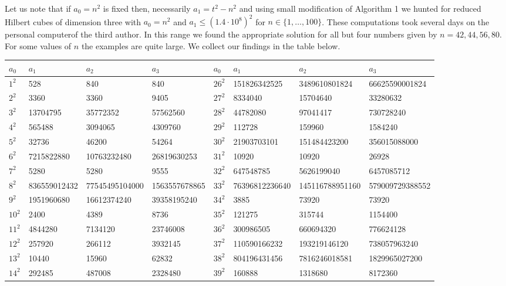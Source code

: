 \documentclass[10pt]{amsart}
\theoremstyle{plain}
\begin{document}
Let us note that if $a_{0}=n^2$ is fixed then, necessarily $a_{1}=t^2-n^2$ and using small modification of Algorithm 1 we hunted for reduced Hilbert cubes of dimension three with $a_{0}=n^2$ and $a_{1}\leq (1.4\cdot 10^8)^2$ for $n\in\{1, \ldots, 100\}$. These computations took several days on the personal computerof the third author. In this range we found the appropriate solution for all but four numbers given by $n=42, 44, 56,  80$. For some values of $n$ the examples are quite large. We collect our findings in the table below. 
\begin{landscape}
\begin{table}[htbp]
\centering
\begin{tabular}{|l|l|l|l||l|l|l|l|}
\hline
$a_{0}$ & $a_{1}$ & $a_{2}$ & $a_{3}$ &
$a_{0}$ & $a_{1}$ & $a_{2}$ & $a_{3}$ \\
\hline
$1^2$  & 528 & 840 & 840 & $26^2$ & 151826342525 & 3489610801824 & 66625590001824 \\
$2^2$  & 3360 & 3360 & 9405 & $27^2$ & 8334040 & 15704640 & 33280632 \\
$3^2$  & 13704795 & 35772352 & 57562560 & $28^2$ & 44782080 & 97041417 & 730728240 \\
$4^2$  & 565488 & 3094065 & 4309760 & $29^2$ & 112728 & 159960 & 1584240 \\
$5^2$  & 32736 & 46200 & 54264 & $30^2$ & 21903703101 & 151484423200 & 356015088000 \\
$6^2$  & 7215822880 & 10763232480 & 26819630253 & $31^2$ & 10920 & 10920 & 26928 \\
$7^2$  & 5280 & 5280 & 9555 & $32^2$ & 647548785 & 5626199040 & 6457085712 \\
$8^2$  & 836559012432 & 77545495104000 & 1563557678865 & $33^2$ & 76396812236640 & 145116788951160 & 579009729388552 \\
$9^2$  & 1951960680 & 16612374240 & 39358195240 & $34^2$ & 3885 & 73920 & 73920 \\
$10^2$ & 2400 & 4389 & 8736 & $35^2$ & 121275 & 315744 & 1154400 \\
$11^2$ & 4844280 & 7134120 & 23746008 & $36^2$ & 300986505 & 660694320 & 776624128 \\
$12^2$ & 257920 & 266112 & 3932145 & $37^2$ & 110590166232 & 193219146120 & 738057963240 \\
$13^2$ & 10440 & 15960 & 62832 & $38^2$ & 804196431456 & 7816246018581 & 1829965027200 \\
$14^2$ & 292485 & 487008 & 2328480 & $39^2$ & 160888 & 1318680 & 8172360 \\

\end{tabular}
\end{table}
\end{landscape}
\end{document}
